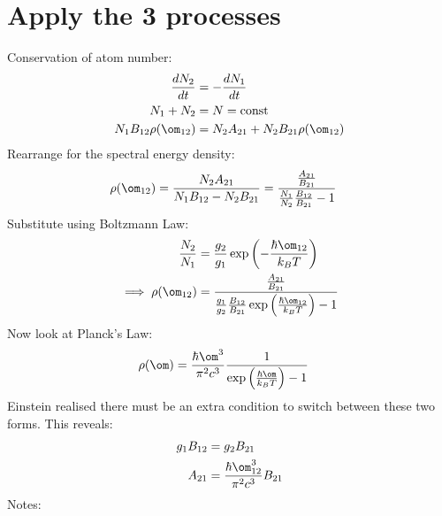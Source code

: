 \documentclass[a4paper, 11pt, normalem]{report}
\begin{document}
\section{Apply the 3 processes}
\begin{figure}[H]
    \centering
\end{figure}
Conservation of atom number:
\begin{align}
    \frac{dN_2}{dt} &= -\frac{dN_1}{dt} \\
    N_1 + N_2 &= N = \text{const} \\
    N_1B_{12}\rho(\om_{12}) &= N_2A_{21} + N_2B_{21}\rho(\om_{12})
\end{align}
Rearrange for the spectral energy density:
\begin{align}
    \rho(\om_{12}) &= \frac{N_2A_{21}}{N_1B_{12}-N_2B_{21}} = \frac{\frac{A_{21}}{B_{21}}}{\frac{N_1}{N_2}\frac{B_{12}}{B_{21}} - 1}
\end{align}
Substitute using Boltzmann Law:
\begin{align}
    \frac{N_2}{N_1} &= \frac{g_2}{g_1}\exp\left(-\frac{\hbar\om_{12}}{k_BT}\right) \\
    \implies \rho(\om_{12}) &= \frac{\frac{A_{21}}{B_{21}}}{\frac{g_1}{g_2}\frac{B_{12}}{B_{21}}\exp\left(\frac{\hbar\om_{12}}{k_BT}\right) - 1}
\end{align}
Now look at Planck's Law:
\begin{align}
    \rho(\om) &= \frac{\hbar\om^3}{\pi^2c^3} \frac{1}{\exp\left(\frac{\hbar\om}{k_BT}\right) - 1}
\end{align}
Einstein realised there must be an extra condition to switch between these two forms.
This reveals:
\begin{align}
    g_1B_{12} &= g_2B_{21} \\
    A_{21} &= \frac{\hbar\om_{12}^3}{\pi^2c^3}B_{21}
\end{align}
Notes:
\end{document}
